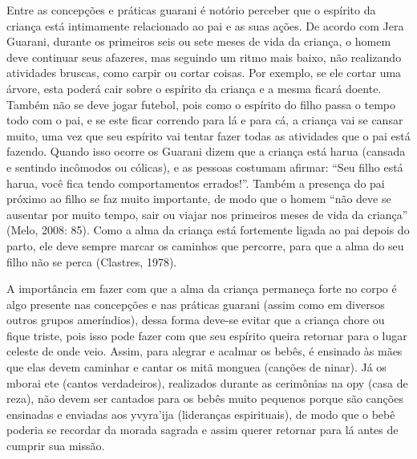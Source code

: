 \documentclass{article}
\begin{document}
Entre as concep\c{c}\~oes e pr\'aticas guarani \'e not\'orio perceber
que o esp\'irito da crian\c{c}a est\'a intimamente relacionado ao pai e
as suas a\c{c}\~oes. De acordo com Jera Guarani, durante os primeiros
seis ou sete meses de vida da crian\c{c}a, o homem deve continuar seus
afazeres, mas seguindo um ritmo mais baixo, n\~ao realizando atividades
bruscas, como carpir ou cortar coisas. Por exemplo, se ele cortar uma
\'arvore, esta poder\'a cair sobre o esp\'irito da crian\c{c}a e a
mesma ficar\'a doente. Tamb\'em n\~ao se deve jogar futebol, pois como
o esp\'irito do filho passa o tempo todo com o pai, e se este ficar
correndo para l\'a e para c\'a, a crian\c{c}a vai se cansar muito, uma
vez que seu esp\'irito vai tentar fazer todas as atividades que o pai
est\'a fazendo. Quando isso ocorre os Guarani dizem que a crian\c{c}a
est\'a harua (cansada e sentindo inc\^omodos ou c\'olicas), e as
pessoas costumam afirmar: {\textquotedblleft}Seu filho est\'a harua,
voc\^e fica tendo comportamentos errados!{\textquotedblright}. Tamb\'em
a presen\c{c}a do pai pr\'oximo ao filho se faz muito importante, de
modo que o homem {\textquotedblleft}n\~ao deve se ausentar por muito
tempo, sair ou viajar nos primeiros meses de vida da
crian\c{c}a{\textquotedblright} (Melo, 2008: 85). Como a alma da
crian\c{c}a est\'a fortemente ligada ao pai depois do parto, ele deve
sempre marcar os caminhos que percorre, para que a alma do seu filho
n\~ao se perca (Clastres, 1978).

A import\^ancia em fazer com que a alma da crian\c{c}a permane\c{c}a
forte no corpo \'e algo presente nas concep\c{c}\~oes e nas pr\'aticas
guarani (assim como em diversos outros grupos amer\'indios), dessa
forma deve-se evitar que a crian\c{c}a chore ou fique triste, pois isso
pode fazer com que seu esp\'irito queira retornar para o lugar celeste
de onde veio. Assim, para alegrar e acalmar os beb\^es, \'e ensinado
\`as m\~aes que elas devem caminhar e cantar os mit\~a monguea
(can\c{c}\~oes de ninar). J\'a os mborai ete (cantos verdadeiros),
realizados durante as cerim\^onias na opy (casa de reza), n\~ao devem
ser cantados para os beb\^es muito pequenos porque s\~ao can\c{c}\~oes
ensinadas e enviadas aos yvyra{\textquoteright}ija (lideran\c{c}as
espirituais), de modo que o beb\^e poderia se recordar da morada
sagrada e assim querer retornar para l\'a antes de cumprir sua
miss\~ao.
\end{document}
